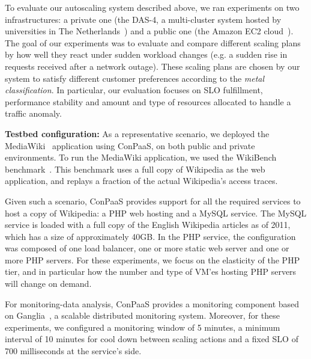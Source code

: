 
To evaluate our autoscaling system described above, we ran experiments
on two infrastructures: a private one (the DAS-4, a multi-cluster system
hosted by universities in The Netherlands~\cite{das4}) and a public
one (the Amazon EC2 cloud~\cite{amazonEC2}). The goal of our experiments
was to evaluate and compare different scaling plans by how well they react under sudden
workload changes (e.g. a sudden rise in requests received after a network outage). These scaling plans are chosen by our system to satisfy different customer preferences according to the \emph{metal classification}. In particular, our evaluation focuses on
SLO fulfillment, performance stability and amount and type of resources allocated to handle
a traffic anomaly. 



\textbf{Testbed configuration:}  As a representative scenario, we deployed the MediaWiki~\cite{mediawiki} application using ConPaaS, on both public and private environments. To run the MediaWiki application, we used the WikiBench benchmark~\cite{wikibench}. This benchmark uses a full copy of Wikipedia as the web application, and replays a fraction of the actual Wikipedia's access traces. 

Given such a scenario, ConPaaS provides support for all the required services to host a copy of Wikipedia: a PHP web hosting and a MySQL service. The MySQL service is loaded with a full copy of the English Wikipedia articles as of 2011, which has a size of approximately 40GB.  In the PHP service, the configuration was composed of one load balancer, one or more static web server and one or more PHP servers. For these experiments, we focus on the elasticity of the PHP tier, and in particular how the number and type of VM'es hosting PHP servers will change on demand.

For monitoring-data analysis, ConPaaS provides a monitoring component based on Ganglia~\cite{ganglia}, a scalable distributed monitoring system. Moreover, for these experiments, we configured a monitoring window of 5 minutes, a minimum interval of 10 minutes for cool down between scaling actions and a fixed SLO of 700 milliseconds at the service's side.

